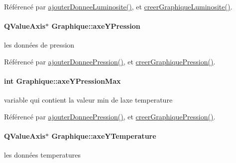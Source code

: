 Référencé par \hyperlink{class_graphique_a1af0e1968998cb7b5ee8add1197cb0e0}{ajouter\+Donnee\+Luminosite()}, et \hyperlink{class_graphique_a3b55b9c4732856e1b25bef167c25ac4c}{creer\+Graphique\+Luminosite()}.

\paragraph[{\texorpdfstring{axe\+Y\+Pression}{axeYPression}}]{\setlength{\rightskip}{0pt plus 5cm}Q\+Value\+Axis$\ast$ Graphique\+::axe\+Y\+Pression\hspace{0.3cm}{\ttfamily [private]}}\hypertarget{class_graphique_a9e5efb7607907c0428baa90bd6fbeb2e}{}\label{class_graphique_a9e5efb7607907c0428baa90bd6fbeb2e}
les données de pression 

Référencé par \hyperlink{class_graphique_a289f0631e56465012511fd7ec9da1b23}{ajouter\+Donnee\+Pression()}, et \hyperlink{class_graphique_adc50b5ae7a54dd576c99e74ec6bf74c5}{creer\+Graphique\+Pression()}.

\paragraph[{\texorpdfstring{axe\+Y\+Pression\+Max}{axeYPressionMax}}]{\setlength{\rightskip}{0pt plus 5cm}int Graphique\+::axe\+Y\+Pression\+Max\hspace{0.3cm}{\ttfamily [private]}}\hypertarget{class_graphique_a2d382f64898f7e768e612c43dba365de}{}\label{class_graphique_a2d382f64898f7e768e612c43dba365de}
variable qui contient la valeur min de l\textquotesingle{}axe temperature 

Référencé par \hyperlink{class_graphique_a289f0631e56465012511fd7ec9da1b23}{ajouter\+Donnee\+Pression()}, et \hyperlink{class_graphique_adc50b5ae7a54dd576c99e74ec6bf74c5}{creer\+Graphique\+Pression()}.

\paragraph[{\texorpdfstring{axe\+Y\+Temperature}{axeYTemperature}}]{\setlength{\rightskip}{0pt plus 5cm}Q\+Value\+Axis$\ast$ Graphique\+::axe\+Y\+Temperature\hspace{0.3cm}{\ttfamily [private]}}\hypertarget{class_graphique_a3df7eeca8d7dba5f528f65d89883736f}{}\label{class_graphique_a3df7eeca8d7dba5f528f65d89883736f}
les données temperatures 

